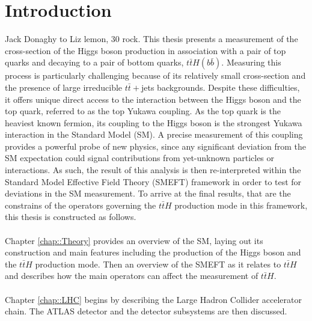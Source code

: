 
\chapter{Introduction}
\label{chap::Introduction}




%
{Jack Donaghy to Liz lemon, 30 rock.}
This thesis presents a measurement of the cross-section of the Higgs boson production in association with a pair of top quarks and decaying to a pair of bottom quarks, $t\bar{t}H(b\bar{b})$. Measuring this process is particularly challenging because of its relatively small cross-section and the presence of large irreducible $t\bar{t}+$jets backgrounds. Despite these difficulties, it offers unique direct access to the interaction between the Higgs boson and the top quark, referred to as the top Yukawa coupling. As the top quark is the heaviest known fermion, its coupling to the Higgs boson is the strongest Yukawa interaction in the Standard Model (SM). A precise measurement of this coupling provides a powerful probe of new physics, since any significant deviation from the SM expectation could signal contributions from yet-unknown particles or interactions. As such, the result of this analysis is then re-interpreted within the Standard Model Effective Field Theory (SMEFT) framework in order to test for deviations in the SM measurement. To arrive at the final results, that are the constrains of the operators governing the $t\bar{t}H$ production mode in this framework, this thesis is constructed as follows.\\
\\
Chapter \ref{chap::Theory} provides an overview of the SM, laying out its construction and main features including the production of the Higgs boson and the $t\bar{t}H$ production mode. Then an overview of the SMEFT as it relates to $t\bar{t}H$ and describes how the main operators can affect the measurement of $t\bar{t}H$.
\\
\\
Chapter \ref{chap::LHC} begins by describing the Large Hadron Collider accelerator chain. The ATLAS detector and the detector subsystems are then discussed.
